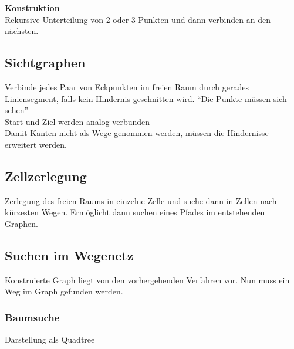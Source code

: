 \textbf{Konstruktion}\\
Rekursive Unterteilung von 2 oder 3 Punkten und dann verbinden an den nächsten.


\subsection{Sichtgraphen}
Verbinde jedes Paar von Eckpunkten im freien Raum durch gerades Liniensegment, falls kein Hindernis geschnitten wird.
\enquote{Die Punkte müssen sich sehen}\\
Start und Ziel werden analog verbunden\\

Damit Kanten nicht als Wege genommen werden, müssen die Hindernisse erweitert werden.

\subsection{Zellzerlegung}
Zerlegung des freien Raums in einzelne Zelle und suche dann in Zellen nach kürzesten Wegen. Ermöglicht dann
suchen eines Pfades im entstehenden Graphen.


\subsection{Suchen im Wegenetz}
Konstruierte Graph liegt von den vorhergehenden Verfahren vor. Nun muss ein Weg im Graph gefunden werden.

\subsubsection{Baumsuche}
Darstellung als Quadtree

